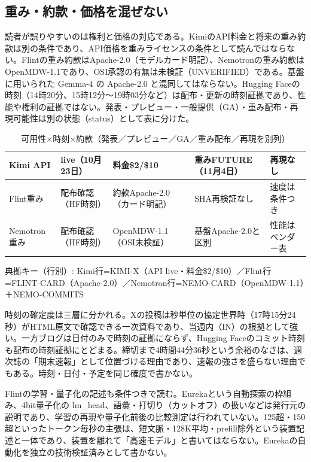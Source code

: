 \documentclass[lualatex,a4paper,10pt]{jlreq}
\begin{document}
\subsection*{重み・約款・価格を混ぜない}


読者が誤りやすいのは権利と価格の対応である。KimiのAPI料金と将来の重み約款は別の条件であり、API価格を重みライセンスの条件として読んではならない。Flintの重み約款はApache-2.0（モデルカード明記）、Nemotronの重み約款はOpenMDW-1.1であり、OSI承認の有無は未検証（UNVERIFIED）である。基盤に用いられた Gemma-4 の Apache-2.0 と混同してはならない。Hugging Faceの時刻（14時20分、15時12分～19時03分など）は配布・更新の時刻証拠であり、性能や権利の証拠ではない。発表・プレビュー・一般提供（GA）・重み配布・再現可能性は別の状態（status）として表に分けた。


\begin{table}[htbp]\centering\footnotesize
\caption{可用性×時刻×約款（発表／プレビュー／GA／重み配布／再現を別列）}
\begin{tabularx}{0.96\linewidth}{@{}XXXXX@{}}
\toprule
Kimi API & live（10月23日） & 料金\$2/\$10 & 重みFUTURE（11月4日） & 再現なし \\
\midrule
Flint重み & 配布確認（HF時刻） & 約款Apache-2.0（カード明記） & SHA再検証なし & 速度は条件つき \\
Nemotron重み & 配布確認（HF時刻） & OpenMDW-1.1（OSI未検証） & 基盤Apache-2.0と区別 & 性能はベンダー表 \\
\bottomrule
\end{tabularx}
{\scriptsize\color{SurveyMuted} 典拠キー（行別）: Kimi行=KIMI-X（API live・料金\$2/\$10）／Flint行=FLINT-CARD（Apache-2.0）／Nemotron行=NEMO-CARD（OpenMDW-1.1）＋NEMO-COMMITS\par}
\end{table}


時刻の確定度は三層に分かれる。Xの投稿は秒単位の協定世界時（17時15分24秒）がHTML原文で確認できる一次資料であり、当週内（IN）の根拠として強い。一方ブログは日付のみで時刻の証拠にならず、Hugging Faceのコミット時刻も配布の時刻証拠にとどまる。締切まで4時間44分36秒という余裕のなさは、週次誌の「期末速報」として位置づける理由であり、速報の強さを盛らない理由でもある。時刻・日付・予定を同じ確度で書かない。


Flintの学習・量子化の記述も条件つきで読む。Eurekaという自動探索の枠組み、4bit量子化の lm\_head、語彙・打切り（カットオフ）の扱いなどは発行元の説明であり、学習の再現や量子化前後の比較測定は行われていない。125超・150超といったトークン毎秒の主張は、短文脈・128K平均・prefill除外という装置記述と一体であり、装置を離れて「高速モデル」と書いてはならない。Eurekaの自動化を独立の技術検証済みとして書かない。
\end{document}
